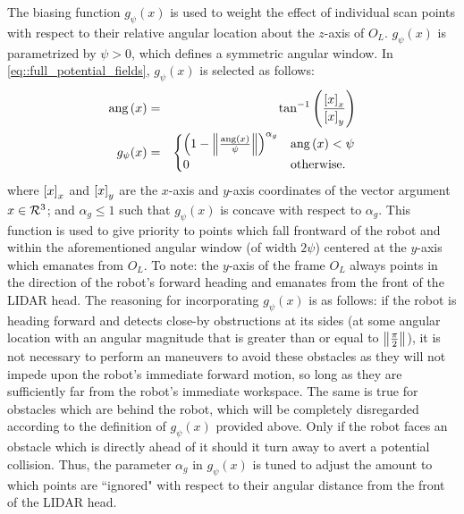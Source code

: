 			The biasing function $g_{\psi}(x)$ is used to weight the effect of individual scan points with respect to their relative angular location about the $z$-axis of $O_{L}$. $g_{\psi}(x)$ is parametrized by $\psi>0$, which defines a symmetric angular window. In \ref{eq::full_potential_fields}, $g_{\psi}(x)$ is selected as follows:
				\begin{eqnarray}
					\text{ang}\left(x\right) &=& \tan^{-1}\left( \frac{\left[x\right]_{x}}{\left[x\right]_{y}} \right) \nonumber\\
					g_{\psi}(x) &=& 
					\begin{cases}
					\left(1-\left\lVert\frac{\text{ang}\left(x\right)}{\psi}\right\rVert\right)^{\alpha_{g}}	& \text{ang}\left(x\right) < \psi \\
					0 	& \text{otherwise}.
					\end{cases}
				\end{eqnarray}
			where $\left[x\right]_{x}$ and $\left[x\right]_{y}$ are the $x$-axis and $y$-axis coordinates of the vector argument $x\in{\cal R}^{3}$; and $\alpha_{g}\leq1$ such that $g_{\psi}(x)$ is concave with respect to $\alpha_{g}$. This function is used to give priority to points which fall frontward of the robot and within the aforementioned angular window (of width $2\psi$) centered at the $y$-axis which emanates from $O_{L}$. To note: the $y$-axis of the frame $O_{L}$ always points in the direction of the robot's forward heading and emanates from the front of the LIDAR head. The reasoning for incorporating $g_{\psi}(x)$ is as follows: if the robot is heading forward and detects close-by obstructions at its sides (\IE at some angular location with an angular magnitude that is greater than or equal to $\left\lVert\frac{\pi}{2}\right\rVert$), it is not necessary to perform an maneuvers to avoid these obstacles as they will not impede upon the robot's immediate forward motion, so long as they are sufficiently far from the robot's immediate workspace. The same is true for obstacles which are behind the robot, which will be completely disregarded according to the definition of $g_{\psi}(x)$ provided above. Only if the robot faces an obstacle which is directly ahead of it should it turn away to avert a potential collision. Thus, the parameter $\alpha_{g}$ in $g_{\psi}(x)$ is tuned to adjust the amount to which points are ``ignored" with respect to their angular distance from the front of the LIDAR head.


